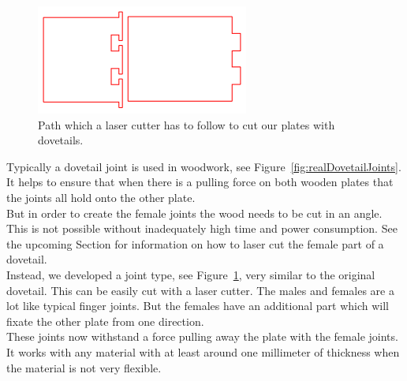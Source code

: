 \documentclass[../ClassicThesis.tex]{subfiles}
\begin{document}
\begin{figure}[!ht]
\centering
\includegraphics[width=.5\columnwidth]{Images/schwalbe.png}
\caption{Path which a laser cutter has to follow to cut our plates with dovetails.}
\label{fig:dovetailJoints}
\end{figure}
    
    Typically a dovetail joint is used in woodwork, see Figure~\ref{fig:realDovetailJoints}. It helps to ensure that when there is a pulling force on both wooden plates that the joints all hold onto the other plate.\\
    But in order to create the female joints the wood needs to be cut in an angle. This is not possible without inadequately high time and power consumption. See the upcoming Section  for information on how to laser cut the female part of a dovetail.\\
    Instead, we developed a joint type, see Figure~\ref{fig:dovetailJoints}, very similar to the original dovetail. This can be easily cut with a laser cutter.
    The males and females are a lot like typical finger joints. But the females have an additional part which will fixate the other plate from one direction.\\
    These joints now withstand a force pulling away the plate with the female joints. It works with any material with at least around one millimeter of thickness when the material is not very flexible.
\end{document}
